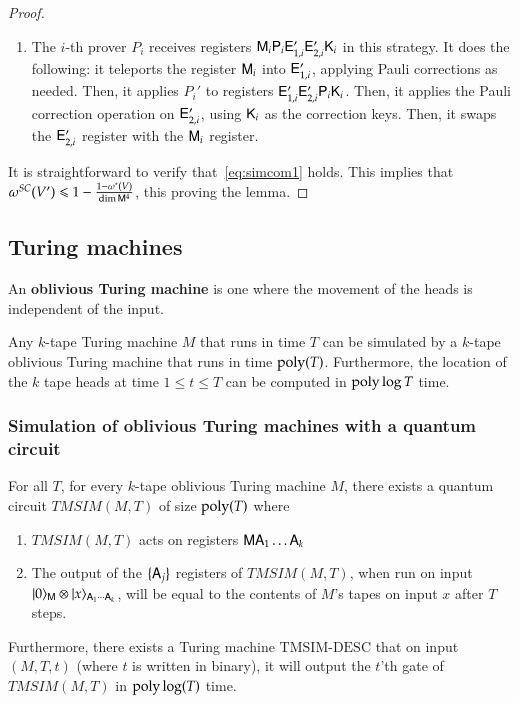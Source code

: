 \begin{proof}
\begin{enumerate}
		\item The $i$-th prover $P_i$ receives registers ${\mathsf{M}}_i {\mathsf{P}}_i {\mathsf{E}}_{1,i}' {\mathsf{E}}_{2,i}' {\mathsf{K}}_i$ in this strategy. It does the following: it teleports the register ${\mathsf{M}}_i$ into ${\mathsf{E}}_{1,i}'$, applying Pauli corrections as needed. Then, it applies $P_i'$ to registers ${\mathsf{E}}_{1,i}' {\mathsf{E}}_{2,i}' {\mathsf{P}}_i {\mathsf{K}}_i$. Then, it applies the Pauli correction operation on ${\mathsf{E}}_{2,i}'$, using ${\mathsf{K}}_i$ as the correction keys. Then, it swaps the ${\mathsf{E}}_{2,i}'$ register with the ${\mathsf{M}}_i$ register. 
	\end{enumerate}
	It is straightforward to verify that~\eqref{eq:simcom1} holds.  This implies that $\omega^{SC}(V') \leqslant 1 - \frac{1 - \omega^*(V)}{\dim {\mathsf{M}}^4}$, this proving the lemma.
\end{proof}


\subsection{Turing machines}
\label{sec:turing_machines}

An \textbf{oblivious Turing machine} is one where the movement of the heads is independent of the input.

\begin{theorem}\label{thm:pippenger}
Any $k$-tape Turing machine $M$ that runs in time $T$ can be simulated by a $k$-tape oblivious Turing machine that runs in time $\operatorname{poly}(T)$. Furthermore, the location of the $k$ tape heads at time $1 \leq t \leq T$ can be computed in $\operatorname{poly} \log T$ time.
\end{theorem}


\subsubsection{Simulation of oblivious Turing machines with a quantum circuit}

\begin{lemma}\label{lem:tmsim}
	For all $T$, for every $k$-tape oblivious Turing machine $M$, there exists a quantum circuit $TMSIM(M,T)$ of size $\operatorname{poly}(T)$ where
	\begin{enumerate}
		\item $TMSIM(M,T)$ acts on registers ${\mathsf{M}} {\mathsf{A}}_1 \ldots {\mathsf{A}}_k$
		\item The output of the $\{{\mathsf{A}}_j\}$ registers of $TMSIM(M,T)$, when run on input $|0\rangle_{{\mathsf{M}}} \otimes |x\rangle_{{\mathsf{A}}_1 \cdots {\mathsf{A}}_k}$, will be equal to the contents of $M$'s tapes on input $x$ after $T$ steps.
	\end{enumerate}
	Furthermore, there exists a Turing machine $\text{TMSIM-DESC}$ that on input $(M,T,t)$ (where $t$ is written in binary), it will output the $t$'th gate of $TMSIM(M,T)$ in $\operatorname{poly}\log(T)$ time. 
\end{lemma}

